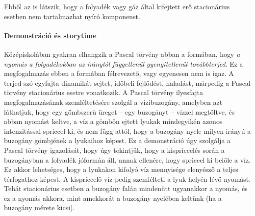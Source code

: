 \documentclass[12pt,a4paper]{scrartcl}
\begin{document}
Ebből az is látszik, hogy a folyadék vagy gáz által kifejtett erő stacionárius esetben nem tartalmazhat nyíró komponenst.

\footnotesize
\paragraph{Demonstráció és storytime}
Középiskolában gyakran elhangzik a Pascal törvény abban a formában, hogy \textit{a nyomás a folyadékokban az iránytól függetlenül gyengítetlenül továbbterjed}. Ez a megfogalmazás ebben a formában félrevezető, vagy egyenesen nem is igaz. A terjed szó egyfajta dinamikát sejtet, időbeli fejlődést, haladást, márpedig a Pascal törvény stacionárius esetre vonatkozik. A Pascal törvény ilyesfajta megfogalmazásának szemléltetésére szolgál a vizibuzogány, amelyben azt láthatjuk, hogy egy gömbszerű üreget -- egy buzogányt -- vízzel megtöltve, és abban nyomást keltve, a víz a gömbön ejtett lyukak mindegyikén azonos intenzitással spriccel ki, és nem függ attól, hogy a buzogány nyele milyen irányú a buzogány gömbjének a lyukaihoz képest. Ez a demonstráció úgy szolgálja a Pascal törvény igazolását, hogy úgy tekintjük, hogy a kispriccelés során a buzogányban a folyadék jóformán áll, annak ellenére, hogy spriccel ki belőle a víz. Ez akkor lehetséges, hogy a lyukakon kifolyó víz mennyisége elenyésző a teljes térfogathoz képest. A kispriccelő víz pedig szemlélteti a lyuk helyén lévő nyomást. Tehát stacionárius esetben a buzogány falán mindenütt ugyanakkor a nyomás, és ez a nyomás akkora, mint amekkorát a buzogány nyelében keltünk (ha a buzogány mérete kicsi).
\normalsize
\end{document}
